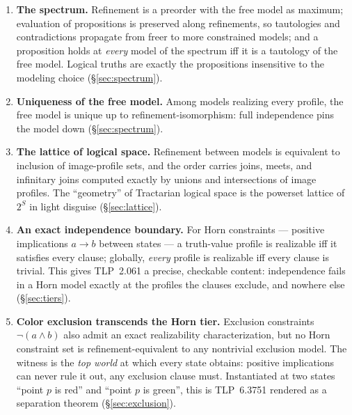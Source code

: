 \documentclass[10pt, letterpaper]{article}
\theoremstyle{remark}
\newcommand{\TLP}[1]{TLP~#1}
\begin{document}
\begin{enumerate}[label=(C\arabic*), leftmargin=3em]
\item\label{c:spectrum} \textbf{The spectrum.} Refinement is a preorder with
  the free model as maximum; evaluation of propositions is preserved along
  refinements, so tautologies and contradictions propagate from freer to more
  constrained models; and a proposition holds at \emph{every} model of the
  spectrum iff it is a tautology of the free model. Logical truths are
  exactly the propositions insensitive to the modeling choice
  (\S\ref{sec:spectrum}).
\item\label{c:unique} \textbf{Uniqueness of the free model.} Among models
  realizing every profile, the free model is unique up to
  refinement-isomorphism: full independence pins the model down
  (\S\ref{sec:spectrum}).
\item\label{c:lattice} \textbf{The lattice of logical space.} Refinement
  between models is equivalent to inclusion of image-profile sets, and the
  order carries joins, meets, and infinitary joins computed exactly by unions
  and intersections of image profiles. The ``geometry'' of Tractarian logical
  space is the powerset lattice of $2^S$ in light disguise
  (\S\ref{sec:lattice}).
\item\label{c:horn} \textbf{An exact independence boundary.} For Horn
  constraints --- positive implications $a \to b$ between states --- a
  truth-value profile is realizable iff it satisfies every clause; globally,
  \emph{every} profile is realizable iff every clause is trivial. This gives
  \TLP{2.061} a precise, checkable content: independence fails in a Horn model
  exactly at the profiles the clauses exclude, and nowhere else
  (\S\ref{sec:tiers}).
\item\label{c:exclusion} \textbf{Color exclusion transcends the Horn tier.}
  Exclusion constraints $\neg(a \wedge b)$ also admit an exact realizability
  characterization, but no Horn constraint set is refinement-equivalent to
  any nontrivial exclusion model. The witness is the \emph{top world} at
  which every state obtains: positive implications can never rule it out,
  any exclusion clause must. Instantiated at two states ``point $p$ is red''
  and ``point $p$ is green'', this is \TLP{6.3751} rendered as a separation
  theorem (\S\ref{sec:exclusion}).
\end{enumerate}
\end{document}
